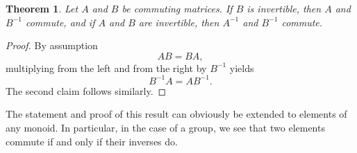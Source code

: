 \documentclass[12pt]{article}
\newtheorem{thm}{Theorem}
\begin{document}
\begin{thm}
Let $A$ and $B$ be commuting matrices.
If $B$ is invertible,
 then $A$ and $B^{-1}$ commute,
and if $A$ and $B$ are invertible, then $A^{-1}$ and $B^{-1}$ commute. 
\end{thm}

\begin{proof} By assumption 
$$
  AB = BA,
$$
multiplying from the left and from the right by $B^{-1}$ yields
$$
  B^{-1} A = A B^{-1}.
$$
The second claim follows similarly. 
\end{proof}

The statement and proof of this result can obviously be extended to elements of any monoid.  In particular, in the case of a group, we see that two elements commute if and only if their inverses do.
\end{document}
